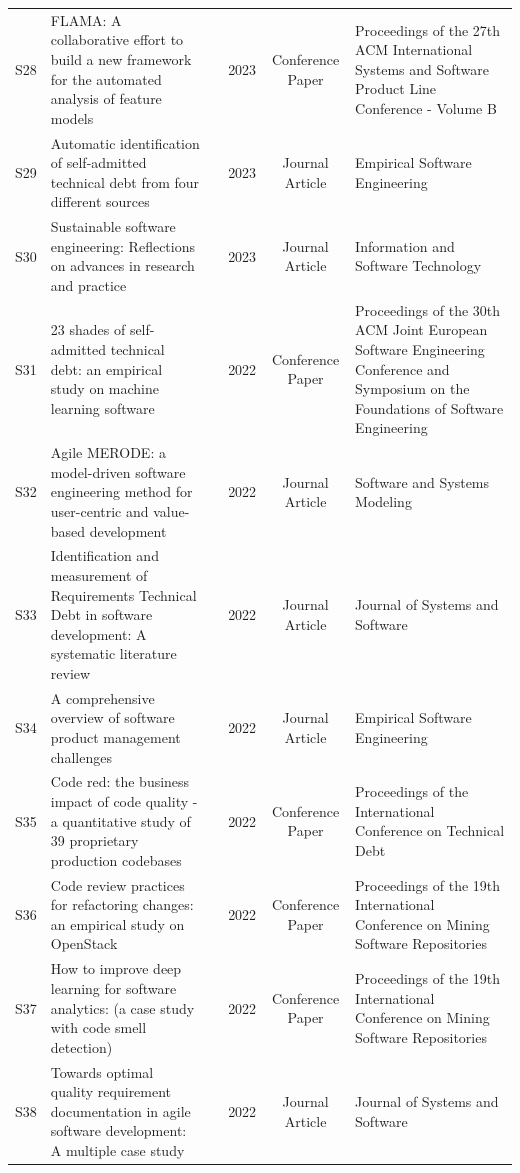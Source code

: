 \documentclass[12pt,reqno, twoside]{amsbook}
\theoremstyle{plain}
\numberwithin{equation}{chapter}
\numberwithin{section}{chapter}
\begin{document}
\begin{landscape}
\begin{center}
\begin{longtable}{|c|p{5cm}|p{4.5cm}|c|c|p{5.5cm}|}
S28 & {FLAMA}: A collaborative effort to build a new framework for the automated analysis of feature models & \citeauthor{Galindo2023} & 2023 & Conference Paper & Proceedings of the 27th ACM International Systems and Software Product Line Conference - Volume B \\
S29 & Automatic identification of self-admitted technical debt from four different sources & \citeauthor{Li2023} & 2023 & Journal Article & Empirical Software Engineering \\
S30 & Sustainable software engineering: Reflections on advances in research and practice & \citeauthor{Venters2023} & 2023 & Journal Article & Information and Software Technology \\

S31 & 23 shades of self-admitted technical debt: an empirical study on machine learning software & \citeauthor{OBrien2022} & 2022 & Conference Paper & Proceedings of the 30th ACM Joint European Software Engineering Conference and Symposium on the Foundations of Software Engineering \\
S32 & Agile {MERODE}: a model-driven software engineering method for user-centric and value-based development & \citeauthor{Snoeck2022} & 2022 & Journal Article & Software and Systems Modeling \\
S33 & Identification and measurement of Requirements Technical Debt in software development: A systematic literature review & \citeauthor{Melo2022} & 2022 & Journal Article & Journal of Systems and Software \\
S34 & A comprehensive overview of software product management challenges & \citeauthor{Springer2022} & 2022 & Journal Article & Empirical Software Engineering \\
S35 & Code red: the business impact of code quality - a quantitative study of 39 proprietary production codebases & \citeauthor{Tornhill2022} & 2022 & Conference Paper & Proceedings of the International Conference on Technical Debt \\
S36 & Code review practices for refactoring changes: an empirical study on {OpenStack} & \citeauthor{AlOmar2022} & 2022 & Conference Paper & Proceedings of the 19th International Conference on Mining Software Repositories \\
S37 & How to improve deep learning for software analytics: (a case study with code smell detection) & \citeauthor{Yedida2022} & 2022 & Conference Paper & Proceedings of the 19th International Conference on Mining Software Repositories \\
S38 & Towards optimal quality requirement documentation in agile software development: A multiple case study & \citeauthor{Behutiye2022} & 2022 & Journal Article & Journal of Systems and Software \\


\end{longtable}
\end{center}
\end{landscape}
\end{document}
